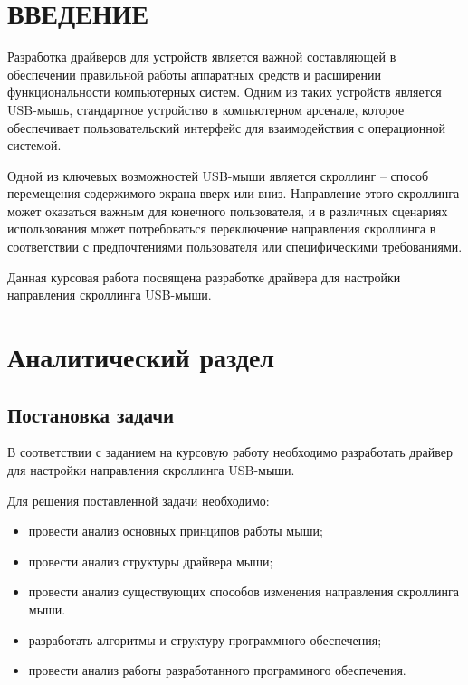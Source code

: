 \documentclass{bmstu}
\begin{document}

\chapter*{ВВЕДЕНИЕ}

Разработка драйверов для устройств является важной составляющей в обеспечении правильной работы аппаратных средств и расширении функциональности компьютерных систем. Одним из таких устройств является USB-мышь, стандартное устройство в компьютерном арсенале, которое обеспечивает пользовательский интерфейс для взаимодействия с операционной системой.

Одной из ключевых возможностей USB-мыши является скроллинг -- способ перемещения содержимого экрана вверх или вниз. Направление этого скроллинга может оказаться важным для конечного пользователя, и в различных сценариях использования может потребоваться переключение направления скроллинга в соответствии с предпочтениями пользователя или специфическими требованиями.

Данная курсовая работа посвящена разработке драйвера для настройки направления скроллинга USB-мыши.
\chapter{Аналитический раздел}

\section{Постановка задачи}
В соответствии с заданием на курсовую работу необходимо разработать драйвер для настройки направления скроллинга USB-мыши.

Для решения поставленной задачи необходимо:

\begin{itemize}
    \item провести анализ основных принципов работы мыши;
	\item провести анализ структуры драйвера мыши;
	\item провести анализ существующих способов изменения направления скроллинга мыши.
	\item разработать алгоритмы и структуру программного обеспечения;
	\item провести анализ работы разработанного программного обеспечения.
\end{itemize}
\end{document}
